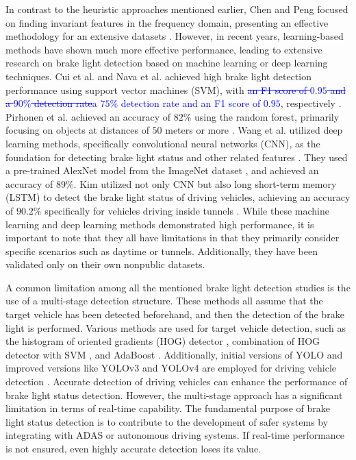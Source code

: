 In contrast to the heuristic approaches mentioned earlier, Chen and Peng focused on finding invariant features in the frequency domain, presenting an effective methodology for an extensive datasets \cite{chen2012frequency}.
However, in recent years, learning-based methods have shown much more effective performance, leading to extensive research on brake light detection based on machine learning or deep learning techniques.
Cui et al. and Nava et al. achieved high brake light detection performance using support vector machines (SVM), with \textcolor{blue}{ \sout{an F1 score of $0.95$ and a $90\%$ detection rate}a $75\%$ detection rate and an F1 score of $0.95$}, respectively \cite{cui2015vision, nava2019collision}. 
Pirhonen et al. achieved an accuracy of $82\%$ using the random forest, primarily focusing on objects at distances of $50$ meters or more \cite{pirhonen2022brake}.
Wang et al. utilized deep learning methods, specifically convolutional neural networks (CNN), as the foundation for detecting brake light status and other related features \cite{wang2016appearance}.
They used a pre-trained AlexNet model \cite{krizhevsky2012imagenet} from the ImageNet dataset \cite{russakovsky2015imagenet}, and achieved an accuracy of $89\%$.
Kim utilized not only CNN but also long short-term memory (LSTM) to detect the brake light status of driving vehicles, achieving an accuracy of $90.2\%$ specifically for vehicles driving inside tunnels \cite{kim2022detecting}.
While these machine learning and deep learning methods demonstrated high performance, it is important to note that they all have limitations in that they primarily consider specific scenarios such as daytime or tunnels.
Additionally, they have been validated only on their own nonpublic datasets.

A common limitation among all the mentioned brake light detection studies is the use of a multi-stage detection structure.
These methods all assume that the target vehicle has been detected beforehand, and then the detection of the brake light is performed.
Various methods are used for target vehicle detection, such as the histogram of oriented gradients (HOG) detector \cite{chen2015daytime, wang2016appearance}, combination of HOG detector with SVM \cite{cui2015vision}, and AdaBoost \cite{liu2015vision, freund1996experiments}.
Additionally, initial versions of YOLO \cite{redmon2016you, redmon2017yolo9000} and improved versions like YOLOv3 \cite{redmon2018yolov3} and YOLOv4 \cite{bochkovskiy2020yolov4} are employed for driving vehicle detection \cite{pirhonen2022brake, kim2022detecting}.
Accurate detection of driving vehicles can enhance the performance of brake light status detection. 
However, the multi-stage approach has a significant limitation in terms of real-time capability. 
The fundamental purpose of brake light status detection is to contribute to the development of safer systems by integrating with ADAS or autonomous driving systems. If real-time performance is not ensured, even highly accurate detection loses its value.

